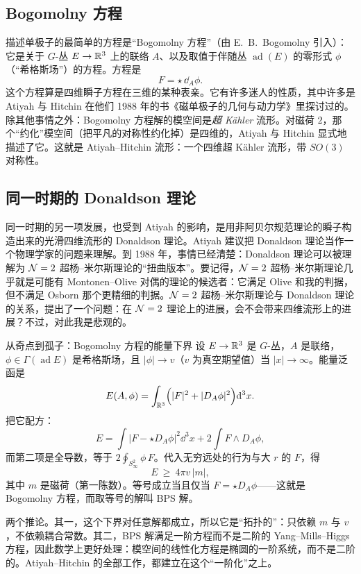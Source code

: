 \subsection{Bogomolny 方程}

描述单极子的最简单的方程是“Bogomolny 方程”（由 E.~B.~Bogomolny 引入）：它是关于 $G$-丛 $E\to\mathbb{R}^3$ 上的联络 $A$、以及取值于伴随丛 $\operatorname{ad}(E)$ 的零形式 $\phi$（“希格斯场”）的方程。方程是
\begin{equation}
  F=\star\,\dd_A\phi .
  \label{eq:bogomolny}
\end{equation}
这个方程算是四维瞬子方程在三维的某种表亲。它有许多迷人的性质，其中许多是 Atiyah 与 Hitchin 在他们 1988 年的书《磁单极子的几何与动力学》里探讨过的。除其他事情之外：Bogomolny 方程解的模空间是\emph{超 Kähler} 流形。对磁荷 $2$，那个“约化”模空间（把平凡的对称性约化掉）是四维的，Atiyah 与 Hitchin 显式地描述了它。这就是 Atiyah--Hitchin 流形：一个四维超 Kähler 流形，带 $SO(3)$ 对称性。

\subsection{同一时期的 Donaldson 理论}

同一时期的另一项发展，也受到 Atiyah 的影响，是用非阿贝尔规范理论的瞬子构造出来的光滑四维流形的 Donaldson 理论。Atiyah 建议把 Donaldson 理论当作一个物理学家的问题来理解。到 1988 年，事情已经清楚：Donaldson 理论可以被理解为 $\mathcal{N}=2$ 超杨--米尔斯理论的“扭曲版本”。要记得，$\mathcal{N}=2$ 超杨--米尔斯理论几乎就是可能有 Montonen--Olive 对偶的理论的候选者：它满足 Olive 和我的判据，但不满足 Osborn 那个更精细的判据。$\mathcal{N}=2$ 超杨--米尔斯理论与 Donaldson 理论的关系，提出了一个问题：在 $\mathcal{N}=2$ 理论上的进展，会不会带来四维流形上的进展？不过，对此我是悲观的。

\begin{pizhu}{从奇点到孤子：Bogomolny 方程的能量下界}
设 $E\to\mathbb{R}^3$ 是 $G$-丛，$A$ 是联络，$\phi\in\Gamma(\operatorname{ad}E)$ 是希格斯场，且 $|\phi|\to v$（$v$ 为真空期望值）当 $|x|\to\infty$。能量泛函是
\[
  E(A,\phi)=\int_{\mathbb{R}^3}\Bigl(|F|^2+|D_A\phi|^2\Bigr)\mathrm{d}^3x .
\]
把它配方：
\[
  E=\int|F-\star D_A\phi|^2\dd^3x+2\int F\wedge D_A\phi ,
\]
而第二项是全导数，等于 $\displaystyle 2\oint_{S^2_\infty}\phi\, F$。代入无穷远处的行为与大 $r$ 的 $F$，得
\[
  E\ \ge\ 4\pi v\,|m| ,
\]
其中 $m$ 是磁荷（第一陈数）。等号成立当且仅当 $F=\star D_A\phi$——这就是 Bogomolny 方程，而取等号的解叫 BPS 解。

两个推论。其一，这个下界对任意解都成立，所以它是“拓扑的”：只依赖 $m$ 与 $v$，不依赖耦合常数。其二，BPS 解满足一阶方程而不是二阶的 Yang--Mills--Higgs 方程，因此数学上更好处理：模空间的线性化方程是椭圆的一阶系统，而不是二阶的。Atiyah--Hitchin 的全部工作，都建立在这个“一阶化”之上。
\end{pizhu}

